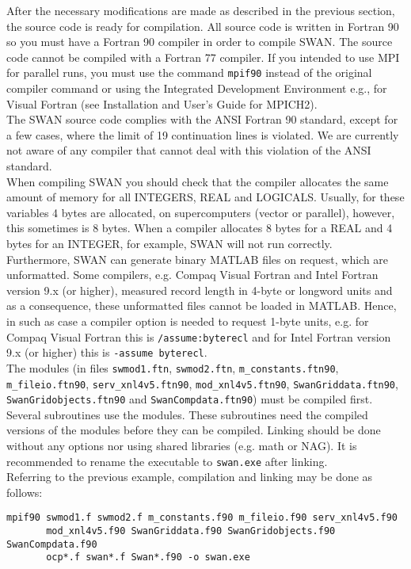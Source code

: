 \documentclass[12pt]{book}
\begin{document}
After the necessary modifications are made as described in the previous section, the source code is
ready for compilation. All source code is written in Fortran 90 so you must have a
Fortran 90 compiler in order to compile SWAN. The source code cannot be compiled with a Fortran 77
compiler. If you intended to use MPI for parallel runs, you must use the command {\tt mpif90} instead
of the original compiler command or using the Integrated Development Environment e.g., for Visual
Fortran (see Installation and User's Guide for MPICH2).
\\[2ex]
\noindent
The SWAN source code complies with the ANSI Fortran 90 standard, except for a few cases, where
the limit of 19 continuation lines is violated. We are currently not aware of any compiler that cannot
deal with this violation of the ANSI standard.
\\[2ex]
\noindent
When compiling SWAN you should check that the compiler allocates the same amount of memory
for all {\scriptsize INTEGERS}, {\scriptsize REAL} and {\scriptsize LOGICALS}. Usually, for these
variables 4 bytes are allocated, on supercomputers (vector or parallel), however, this sometimes
is 8 bytes. When a compiler allocates 8 bytes for a {\scriptsize REAL} and 4 bytes for an
{\scriptsize INTEGER}, for example, SWAN will not run correctly.
\\[2ex]
\noindent
Furthermore, SWAN can generate binary MATLAB files on request, which are unformatted. Some compilers,
e.g. Compaq Visual Fortran and Intel Fortran version 9.x (or higher), measured record length in 4-byte or longword units and
as a consequence, these unformatted files cannot be loaded in MATLAB. Hence, in such as case a
compiler option is needed to request 1-byte units, e.g. for Compaq Visual Fortran this is
{\tt /assume:byterecl} and for Intel Fortran version 9.x (or higher) this is {\tt -assume byterecl}.
\\[2ex]
\noindent
The modules (in files {\tt swmod1.ftn}, {\tt swmod2.ftn}, {\tt m\_constants.ftn90},
{\tt m\_fileio.ftn90}, {\tt serv\_xnl4v5.ftn90}, {\tt mod\_xnl4v5.ftn90},
{\tt SwanGriddata.ftn90}, {\tt SwanGridobjects.ftn90} and {\tt SwanCompdata.ftn90}) must be compiled first.
Several subroutines use the modules. These subroutines need the compiled versions of the modules before they can be compiled.
Linking should be done without any options nor using shared libraries (e.g. math or NAG). It is
recommended to rename the executable to {\tt swan.exe} after linking.
\\[2ex]
\noindent
Referring to the previous example, compilation and linking may be done as follows:
\begin{verbatim}
mpif90 swmod1.f swmod2.f m_constants.f90 m_fileio.f90 serv_xnl4v5.f90
       mod_xnl4v5.f90 SwanGriddata.f90 SwanGridobjects.f90 SwanCompdata.f90
       ocp*.f swan*.f Swan*.f90 -o swan.exe
\end{verbatim}
\end{document}
